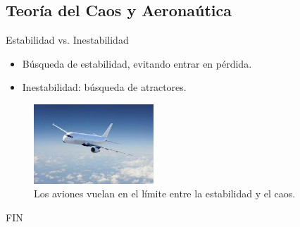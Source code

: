 \documentclass[8pt]{beamer}
\begin{document}
\subsection{Teoría del Caos y Aeronaútica}
\begin{frame}
\begin{block}{Estabilidad vs. Inestabilidad }
\begin{itemize}
\item Búsqueda de estabilidad, evitando entrar en pérdida.
\item Inestabilidad: búsqueda de atractores.
\end{itemize}
\end{block}
\begin{figure}[hbtp]
\centering
\includegraphics[width = 0.4\textwidth]{img/aero.jpeg}
\caption{Los aviones vuelan en el límite entre la estabilidad y el caos.}
\label{fig:aviones}
\end{figure}
\end{frame}



\begin{frame}
\Huge{\centerline{FIN}}
\end{frame}

\end{document}
